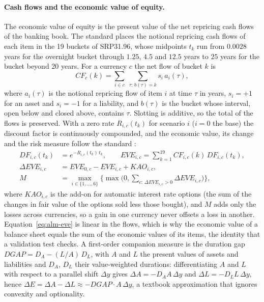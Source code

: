 \paragraph{Cash flows and the economic value of equity.}
The economic value of equity is the present value of the net repricing cash flows of the banking book. The standard places the notional repricing cash flows of each item in the 19 buckets of SRP31.96, whose midpoints $t_k$ run from $0.0028$ years for the overnight bucket through $1.25$, $4.5$ and $12.5$ years to $25$ years for the bucket beyond 20 years. For a currency $c$ the net flow of bucket $k$ is
\begin{equation}
CF_c(k)=\sum_{i\in c}\;\sum_{\tau:\,b(\tau)=k} s_i\,a_i(\tau),
\label{eq:alm-slot}
\end{equation}
where $a_i(\tau)$ is the notional repricing flow of item $i$ at time $\tau$ in years, $s_i=+1$ for an asset and $s_i=-1$ for a liability, and $b(\tau)$ is the bucket whose interval, open below and closed above, contains $\tau$. Slotting is additive, so the total of the flows is preserved. With a zero rate $R_{i,c}(t_k)$ for scenario $i$ ($i=0$ the base) the discount factor is continuously compounded, and the economic value, its change and the risk measure follow the standard \citep{alm:srp31,alm:bcbs2016}:
\begin{align}
DF_{i,c}(t_k)&=e^{-R_{i,c}(t_k)\,t_k},\qquad EVE_{i,c}=\sum_{k=1}^{19}CF_{i,c}(k)\,DF_{i,c}(t_k),\label{eq:alm-eve}\\
\Delta EVE_{i,c}&=EVE_{0,c}-EVE_{i,c}+KAO_{i,c},\label{eq:alm-deve}\\
M&=\max_{i\in\{1,\dots,6\}}\Big\{\max\Big(0,\sum_{c:\,\Delta EVE_{i,c}>0}\Delta EVE_{i,c}\Big)\Big\},\label{eq:alm-measure}
\end{align}
where $KAO_{i,c}$ is the add-on for automatic interest rate options (the sum of the changes in fair value of the options sold less those bought), and $M$ adds only the losses across currencies, so a gain in one currency never offsets a loss in another. Equation~\ref{eq:alm-eve} is linear in the flows, which is why the economic value of a balance sheet equals the sum of the economic values of its items, the identity that a validation test checks. A first-order companion measure is the duration gap $DGAP=D_A-(L/A)\,D_L$, with $A$ and $L$ the present values of assets and liabilities and $D_A$, $D_L$ their value-weighted durations: differentiating $A$ and $L$ with respect to a parallel shift $\Delta y$ gives $\Delta A=-D_A A\,\Delta y$ and $\Delta L=-D_L L\,\Delta y$, hence $\Delta E=\Delta A-\Delta L\approx-DGAP\cdot A\,\Delta y$, a textbook approximation that ignores convexity and optionality.

